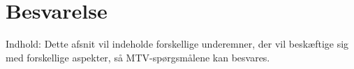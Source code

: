 \section{Besvarelse}
Indhold: Dette afsnit vil indeholde forskellige underemner, der vil beskæftige sig med forskellige aspekter, så MTV-spørgsmålene kan besvares. 